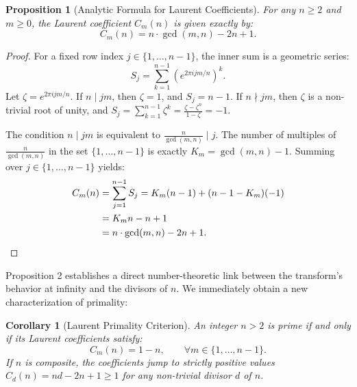 \documentclass[11pt,twoside]{article}
\newtheorem{corollary}{Corollary}
\newtheorem{proposition}{Proposition}
\begin{document}
	\begin{proposition}[Analytic Formula for Laurent Coefficients]
		For any $n \geq 2$ and $m \geq 0$, the Laurent coefficient $C_m(n)$ is given exactly by:
		\begin{equation}
			C_m(n) = n \cdot \gcd(m, n) - 2n + 1.
		\end{equation}
	\end{proposition}
	
	\begin{proof}
		For a fixed row index $j \in \{1, \dots, n-1\}$, the inner sum is a geometric series:
		\begin{equation}
			S_j = \sum_{k=1}^{n-1} \left( e^{2\pi i jm/n} \right)^k.
		\end{equation}
		Let $\zeta = e^{2\pi i jm/n}$. If $n \mid jm$, then $\zeta = 1$, and $S_j = n-1$. If $n \nmid jm$, then $\zeta$ is a non-trivial root of unity, and $S_j = \sum_{k=1}^{n-1} \zeta^k = \frac{\zeta - \zeta^n}{1-\zeta} = -1$.
		
		The condition $n \mid jm$ is equivalent to $\frac{n}{\gcd(m,n)} \mid j$. The number of multiples of $\frac{n}{\gcd(m,n)}$ in the set $\{1, \dots, n-1\}$ is exactly $K_m = \gcd(m,n) - 1$. Summing over $j \in \{1, \dots, n-1\}$ yields:
		\begin{align}
			C_m(n) &= \sum_{j=1}^{n-1} S_j = K_m(n-1) + (n - 1 - K_m)(-1) \nonumber \\
			&= K_m n - n + 1 \nonumber \\
			&= n \cdot \gcd(m, n) - 2n + 1. \qedhere
		\end{align}
	\end{proof}
	
	Proposition 2 establishes a direct number-theoretic link between the transform's behavior at infinity and the divisors of $n$. We immediately obtain a new characterization of primality:
	
	\begin{corollary}[Laurent Primality Criterion]
		An integer $n > 2$ is prime if and only if its Laurent coefficients satisfy:
		\begin{equation}
			C_m(n) = 1 - n, \qquad \forall m \in \{1, \dots, n-1\}.
		\end{equation}
		If $n$ is composite, the coefficients jump to strictly positive values $C_d(n) = nd - 2n + 1 \geq 1$ for any non-trivial divisor $d$ of $n$.
	\end{corollary}
	
\end{document}
